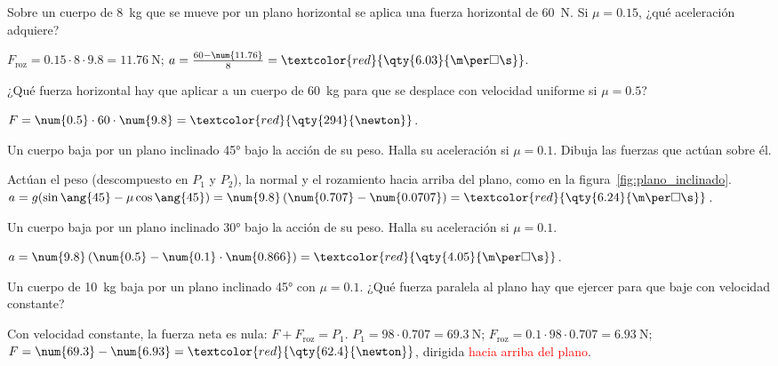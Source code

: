 \begin{exercise}
    Sobre un cuerpo de \qty{8}{\kg} que se mueve por un plano horizontal se aplica una fuerza horizontal de \qty{60}{\newton}. Si \(\mu = \num{0.15}\), ¿qué aceleración adquiere?
    \begin{solu}
        \(F_\text{roz} = \num{0.15} \cdot 8 \cdot \num{9.8} = \qty{11.76}{\newton}\); \(a = \frac{60 - \num{11.76}}{8} = \textcolor{red}{\qty{6.03}{\m\per\square\s}}\).
    \end{solu}
\end{exercise}

\begin{exercise}
    ¿Qué fuerza horizontal hay que aplicar a un cuerpo de \qty{60}{\kg} para que se desplace con velocidad uniforme si \(\mu = \num{0.5}\)?
    \begin{solu}
        \(F = \num{0.5} \cdot 60 \cdot \num{9.8} = \textcolor{red}{\qty{294}{\newton}}\).
    \end{solu}
\end{exercise}

\begin{exercise}
    Un cuerpo baja por un plano inclinado \ang{45} bajo la acción de su peso. Halla su aceleración si \(\mu = \num{0.1}\). Dibuja las fuerzas que actúan sobre él.
    \begin{solu}
        Actúan el peso (descompuesto en \(P_1\) y \(P_2\)), la normal y el rozamiento hacia arriba del plano, como en la figura~\ref{fig:plano_inclinado}.
        \(a = g(\sin\ang{45} - \mu\cos\ang{45}) = \num{9.8}\,(\num{0.707} - \num{0.0707}) = \textcolor{red}{\qty{6.24}{\m\per\square\s}}\).
    \end{solu}
\end{exercise}

\begin{exercise}
    Un cuerpo baja por un plano inclinado \ang{30} bajo la acción de su peso. Halla su aceleración si \(\mu = \num{0.1}\).
    \begin{solu}
        \(a = \num{9.8}\,(\num{0.5} - \num{0.1} \cdot \num{0.866}) = \textcolor{red}{\qty{4.05}{\m\per\square\s}}\).
    \end{solu}
\end{exercise}

\begin{exercise}
    Un cuerpo de \qty{10}{\kg} baja por un plano inclinado \ang{45} con \(\mu = \num{0.1}\). ¿Qué fuerza paralela al plano hay que ejercer para que baje con velocidad constante?
    \begin{solu}
        Con velocidad constante, la fuerza neta es nula: \(F + F_\text{roz} = P_1\).
        \(P_1 = 98 \cdot \num{0.707} = \qty{69.3}{\newton}\); \(F_\text{roz} = \num{0.1} \cdot 98 \cdot \num{0.707} = \qty{6.93}{\newton}\); \(F = \num{69.3} - \num{6.93} = \textcolor{red}{\qty{62.4}{\newton}}\), dirigida \textcolor{red}{hacia arriba del plano}.
    \end{solu}
\end{exercise}

